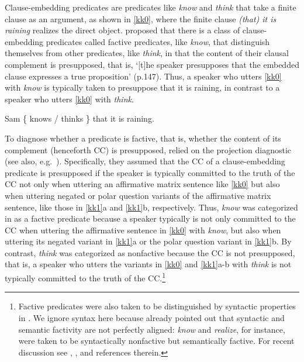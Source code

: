 \documentclass{language}
\newcommand{\6}{\mbox{$[\hspace*{-.6mm}[$}}
\newcommand{\9}{\mbox{$]\hspace*{-.6mm}]$}}
\begin{document}
Clause-embedding predicates are predicates like {\em know} and {\em think} that take a finite clause as an argument, as shown in \ref{kk0}, where the finite clause {\em (that) it is raining} realizes the direct object. \citealt{kiparsky-kiparsky70} proposed that there is a  class of clause-embedding predicates called {\sc factive} predicates, like {\em know}, that distinguish themselves from other predicates, like {\em think}, in that the content of their clausal complement is presupposed, that is, `[t]he speaker presupposes that the embedded clause expresses a true proposition' (p.147). Thus, a speaker who utters \ref{kk0} with {\em know} is typically taken to presuppose that it is raining, in contrast to a speaker who utters \ref{kk0} with {\em think}.

\begin{exe}
\ex\label{kk0} Sam \{ knows / thinks \} that it is raining.
\end{exe}
To diagnose whether a predicate is factive, that is, whether the content of its complement (henceforth CC) is presupposed, \citealt{kiparsky-kiparsky70} relied on the projection diagnostic (see also, e.g.\ \citealt{langendoen-savin71}). Specifically, they assumed that the CC of a clause-embedding predicate is presupposed if the speaker is typically committed to the truth of the CC not only when uttering an affirmative matrix sentence like \ref{kk0} but also when uttering negated or polar question variants of the affirmative matrix sentence, like those in \ref{kk1}a and \ref{kk1}b, respectively. Thus, {\em know} was categorized in \citealt{kiparsky-kiparsky70} as a factive predicate because a speaker typically is not only committed to the CC when uttering the affirmative sentence in \ref{kk0} with {\em know}, but also when uttering its negated variant in \ref{kk1}a or the polar question variant in \ref{kk1}b. By contrast, {\em think} was categorized as nonfactive because the CC is not presupposed, that is, a speaker who utters the variants in \ref{kk0} and \ref{kk1}a-b with {\em think} is not typically committed to the truth of the CC.\footnote{Factive predicates were also taken to be distinguished by syntactic properties in \citealt{kiparsky-kiparsky70}. We ignore syntax here because \citet[fn.3]{kiparsky-kiparsky70} already pointed out that syntactic and semantic factivity are not perfectly aligned: {\em know} and {\em realize}, for instance, were taken to be syntactically nonfactive but semantically factive. For recent discussion see \citealt{white-rawlins-nels2018}, \citealt{djaerv-thesis}, and references therein.}  
\end{document}
